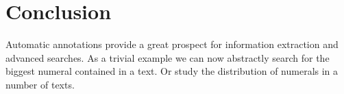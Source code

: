 \documentclass[12pt, draft]{article}
\begin{document}
\section{Conclusion}
Automatic annotations provide a great prospect for information extraction and
advanced searches.  As a trivial example we can now abstractly search for the biggest
numeral contained in a text. Or study the distribution of numerals in a number of texts.


\end{document}
